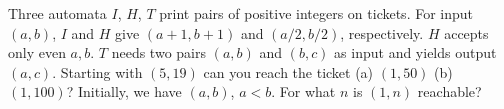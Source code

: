 Three automata $I$, $H$, $T$ print pairs of positive integers on tickets. For input $(a, b)$, $I$ and $H$ give $(a + 1, b + 1)$ and $(a/2, b/2)$, respectively. $H$ accepts only even $a, b$. $T$ needs two pairs $(a, b)$ and $(b, c)$ as input and yields output $(a, c)$. Starting with $(5, 19)$ can you reach the ticket (a) $(1, 50)$ (b) $(1, 100)$? Initially, we have $(a, b)$, $a < b$. For what $n$ is $(1, n)$ reachable?
